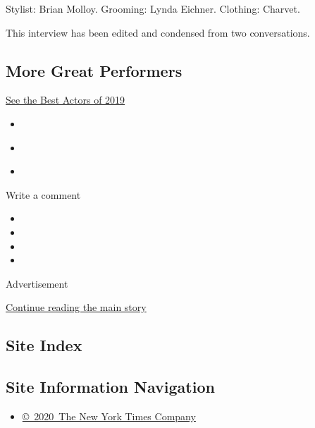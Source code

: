 Stylist: Brian Molloy. Grooming: Lynda Eichner. Clothing: Charvet.

This interview has been edited and condensed from two conversations.

\hypertarget{more-great-performers}{%
\subsection{More Great Performers}\label{more-great-performers}}

\href{https://www.nytimes3xbfgragh.onion/interactive/2019/12/09/magazine/best-actors.html}{See
the Best Actors of 2019}

\begin{itemize}
\tightlist
\item
  \href{/interactive/2019/12/09/magazine/brad-pitt-interview.html}{}
\item
  \href{/interactive/2019/12/09/magazine/jennifer-lopez-hustlers.html}{}
\item
  \href{/interactive/2019/12/09/magazine/lupita-nyongo-us.html}{}
\end{itemize}

Write a comment

\begin{itemize}
\item
\item
\item
\item
\end{itemize}

Advertisement

\protect\hyperlink{after-bottom}{Continue reading the main story}

\hypertarget{site-index}{%
\subsection{Site Index}\label{site-index}}

\hypertarget{site-information-navigation}{%
\subsection{Site Information
Navigation}\label{site-information-navigation}}

\begin{itemize}
\tightlist
\item
  \href{https://help.nytimes3xbfgragh.onion/hc/en-us/articles/115014792127-Copyright-notice}{©~2020~The
  New York Times Company}
\end{itemize}

